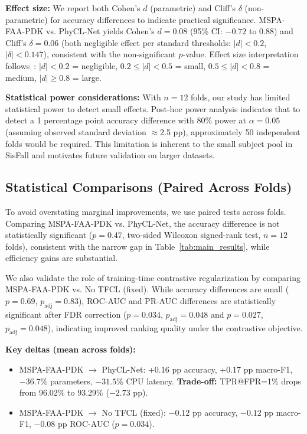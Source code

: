 \documentclass{article}
\begin{document}
\textbf{Effect size:} We report both Cohen's $d$ (parametric) and Cliff's $\delta$ (non-parametric) for accuracy differences to indicate practical significance. MSPA-FAA-PDK vs. PhyCL-Net yields Cohen's $d = 0.08$ (95\% CI: $-0.72$ to $0.88$) and Cliff's $\delta = 0.06$ (both negligible effect per standard thresholds: $|d| < 0.2$, $|\delta| < 0.147$), consistent with the non-significant $p$-value. Effect size interpretation follows~\cite{Cohen1988Statistical}: $|d| < 0.2$ = negligible, $0.2 \leq |d| < 0.5$ = small, $0.5 \leq |d| < 0.8$ = medium, $|d| \geq 0.8$ = large.

\textbf{Statistical power considerations:} With $n=12$ folds, our study has limited statistical power to detect small effects. Post-hoc power analysis indicates that to detect a 1 percentage point accuracy difference with 80\% power at $\alpha=0.05$ (assuming observed standard deviation $\approx$2.5 pp), approximately 50 independent folds would be required. This limitation is inherent to the small subject pool in SisFall and motivates future validation on larger datasets.

\subsection{Statistical Comparisons (Paired Across Folds)}

To avoid overstating marginal improvements, we use paired tests across folds. Comparing MSPA-FAA-PDK vs. PhyCL-Net, the accuracy difference is not statistically significant ($p=0.47$, two-sided Wilcoxon signed-rank test, $n=12$ folds), consistent with the narrow gap in Table~\ref{tab:main_results}, while efficiency gains are substantial.

We also validate the role of training-time contrastive regularization by comparing MSPA-FAA-PDK vs. No TFCL (fixed). While accuracy differences are small ($p=0.69$, $p_{\mathrm{adj}}=0.83$), ROC-AUC and PR-AUC differences are statistically significant after FDR correction ($p=0.034$, $p_{\mathrm{adj}}=0.048$ and $p=0.027$, $p_{\mathrm{adj}}=0.048$), indicating improved ranking quality under the contrastive objective.

\textbf{Key deltas (mean across folds):}
\begin{itemize}
    \item MSPA-FAA-PDK $\to$ PhyCL-Net: +0.16 pp accuracy, +0.17 pp macro-F1, $-36.7\%$ parameters, $-31.5\%$ CPU latency. \textbf{Trade-off:} TPR@FPR=1\% drops from 96.02\% to 93.29\% ($-2.73$ pp).
    \item MSPA-FAA-PDK $\to$ No TFCL (fixed): $-0.12$ pp accuracy, $-0.12$ pp macro-F1, $-0.08$ pp ROC-AUC ($p=0.034$).
\end{itemize}
\end{document}
